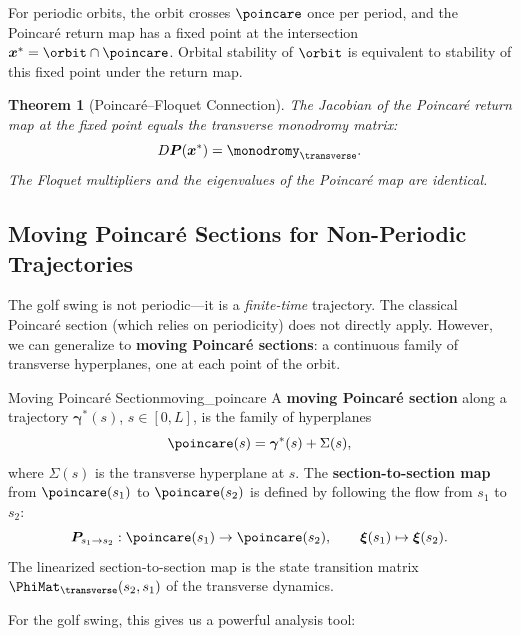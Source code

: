 \documentclass[12pt, openany]{book}
\theoremstyle{plain}
\newtheorem{theorem}{Theorem}[chapter]
\newcommand{\state}{\bm{x}}
\newcommand{\traj}{\bm{\gamma}}
\begin{document}
For periodic orbits, the orbit crosses $\poincare$ once per period, and
the Poincar\'e return map has a fixed point at the intersection
$\state^* = \orbit \cap \poincare$. Orbital stability of $\orbit$ is
equivalent to stability of this fixed point under the return map.

\begin{theorem}[Poincar\'e--Floquet Connection]\label{thm:poincare_floquet}
  The Jacobian of the Poincar\'e return map at the fixed point equals the
  transverse monodromy matrix:
  \begin{equation}
    D\bm{P}(\state^*) = \monodromy_\transverse.
  \end{equation}
  The Floquet multipliers and the eigenvalues of the Poincar\'e map are
  identical.
\end{theorem}

\subsection{Moving Poincar\'e Sections for Non-Periodic Trajectories}

The golf swing is not periodic---it is a \emph{finite-time} trajectory.
The classical Poincar\'e section (which relies on periodicity) does not
directly apply. However, we can generalize to \textbf{moving Poincar\'e
sections}: a continuous family of transverse hyperplanes, one at each point
of the orbit.

\begin{definition}{Moving Poincar\'e Section}{moving_poincare}
  A \textbf{moving Poincar\'e section} along a trajectory $\traj^*(s)$,
  $s \in [0, L]$, is the family of hyperplanes
  \begin{equation}
    \poincare(s) = \traj^*(s) + \Sigma(s),
  \end{equation}
  where $\Sigma(s)$ is the transverse hyperplane at $s$. The
  \textbf{section-to-section map} from $\poincare(s_1)$ to $\poincare(s_2)$
  is defined by following the flow from $s_1$ to $s_2$:
  \begin{equation}
    \bm{P}_{s_1 \to s_2}: \poincare(s_1) \to \poincare(s_2), \qquad
    \bm{\xi}(s_1) \mapsto \bm{\xi}(s_2).
  \end{equation}
  The linearized section-to-section map is the state transition matrix
  $\PhiMat_\transverse(s_2, s_1)$ of the transverse dynamics.
\end{definition}

For the golf swing, this gives us a powerful analysis tool:
\end{document}
